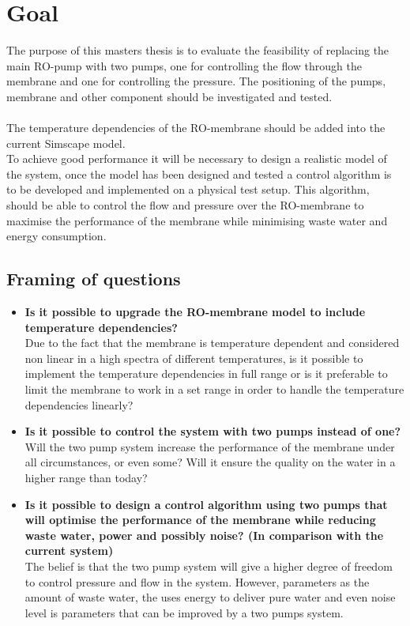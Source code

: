 \section{Goal}
The purpose of this masters thesis is to evaluate the feasibility of replacing the main RO-pump with two pumps, one for controlling the flow through the membrane and one for controlling the pressure. The positioning of the pumps, membrane and other component should be investigated and tested. \\
\\
The temperature dependencies of the RO-membrane should be added into the current Simscape model.
\\
To achieve good performance it will be necessary to design a realistic model of the system, once the model has been designed and tested a control algorithm is to be developed and implemented on a physical test setup. This algorithm, should be able to control the flow and pressure over the RO-membrane to maximise the performance of the membrane while minimising waste water and energy consumption. \\


\subsection{Framing of questions}
\label{framing}
\begin{itemize}
\renewcommand\labelitemi{-}
   \item \textbf{Is it possible to upgrade the RO-membrane model to include temperature dependencies?}\\ Due to the fact that the membrane is temperature dependent and considered non linear in a high spectra of different temperatures, is it possible to implement the temperature dependencies in full range or is it preferable to limit the membrane to work in a set range in order to handle the temperature dependencies linearly?
   \item \textbf{Is it possible to control the system with two pumps instead of one?}\\ Will the two pump system increase the performance of the membrane under all circumstances, or even some? Will it ensure the quality on the water in a higher range than today?   
   \item \textbf{Is it possible to design a control algorithm using two pumps that will optimise the performance of the membrane while reducing waste water, power and possibly noise? (In comparison with the current system)}\\ The belief is that the two pump system will give a higher degree of freedom to control pressure and flow in the system. However, parameters as the amount of waste water, the uses energy to deliver pure water and even noise level is parameters that can be improved by a two pumps system.  
\end{itemize}



